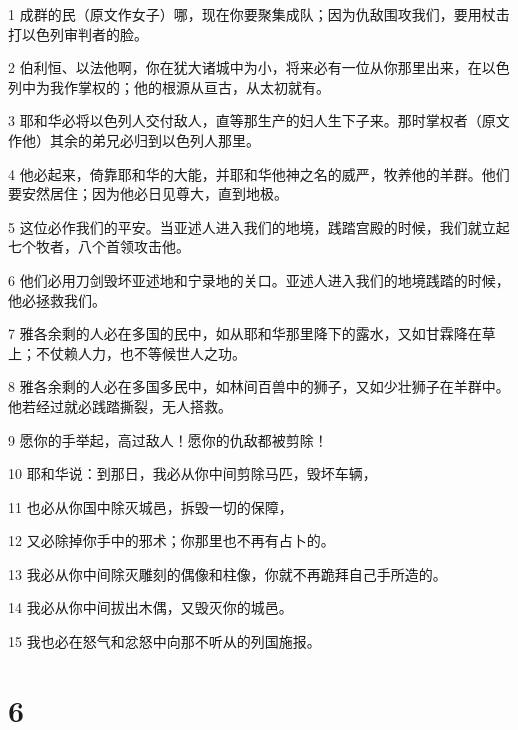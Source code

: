 \par 1 成群的民（原文作女子）哪，现在你要聚集成队；因为仇敌围攻我们，要用杖击打以色列审判者的脸。
\par 2 伯利恒、以法他啊，你在犹大诸城中为小，将来必有一位从你那里出来，在以色列中为我作掌权的；他的根源从亘古，从太初就有。
\par 3 耶和华必将以色列人交付敌人，直等那生产的妇人生下子来。那时掌权者（原文作他）其余的弟兄必归到以色列人那里。
\par 4 他必起来，倚靠耶和华的大能，并耶和华他神之名的威严，牧养他的羊群。他们要安然居住；因为他必日见尊大，直到地极。
\par 5 这位必作我们的平安。当亚述人进入我们的地境，践踏宫殿的时候，我们就立起七个牧者，八个首领攻击他。
\par 6 他们必用刀剑毁坏亚述地和宁录地的关口。亚述人进入我们的地境践踏的时候，他必拯救我们。
\par 7 雅各余剩的人必在多国的民中，如从耶和华那里降下的露水，又如甘霖降在草上；不仗赖人力，也不等候世人之功。
\par 8 雅各余剩的人必在多国多民中，如林间百兽中的狮子，又如少壮狮子在羊群中。他若经过就必践踏撕裂，无人搭救。
\par 9 愿你的手举起，高过敌人！愿你的仇敌都被剪除！
\par 10 耶和华说：到那日，我必从你中间剪除马匹，毁坏车辆，
\par 11 也必从你国中除灭城邑，拆毁一切的保障，
\par 12 又必除掉你手中的邪术；你那里也不再有占卜的。
\par 13 我必从你中间除灭雕刻的偶像和柱像，你就不再跪拜自己手所造的。
\par 14 我必从你中间拔出木偶，又毁灭你的城邑。
\par 15 我也必在怒气和忿怒中向那不听从的列国施报。

\chapter{6}

